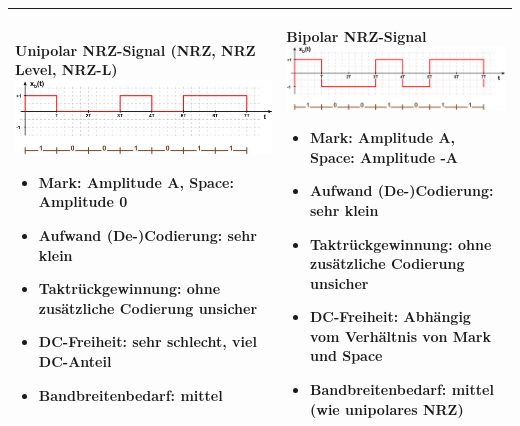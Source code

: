\begin{longtable}{|p{9cm}|p{9cm}|}
	\hline
	\textbf{Unipolar NRZ-Signal (NRZ, NRZ Level, NRZ-L)}\newline
	\includegraphics[width=8cm]{bilder/DigitaleBasisbandSignale/UnipolarNRZ.png}\newline
	\begin{itemize}[noitemsep]
		\item \textbf{Mark:} Amplitude A, \textbf{Space:} Amplitude 0
		\item \textbf{Aufwand (De-)Codierung:} sehr klein
		\item \textbf{Taktrückgewinnung:} ohne zusätzliche Codierung unsicher
		\item \textbf{DC-Freiheit:} sehr schlecht, viel DC-Anteil
		\item \textbf{Bandbreitenbedarf:} mittel
	\end{itemize}
	&
	\textbf{Bipolar NRZ-Signal}\newline
	\includegraphics[width=8cm]{bilder/DigitaleBasisbandSignale/BipolarNRZ.png}\newline
	\begin{itemize}[noitemsep]
		\item \textbf{Mark:} Amplitude A, \textbf{Space:} Amplitude -A
		\item \textbf{Aufwand (De-)Codierung:} sehr klein
		\item \textbf{Taktrückgewinnung:} ohne zusätzliche Codierung unsicher
		\item \textbf{DC-Freiheit:} Abhängig vom Verhältnis von Mark und Space
		\item \textbf{Bandbreitenbedarf:} mittel (wie unipolares NRZ)
	\end{itemize}\\
	
	\hline
	

\end{longtable}

